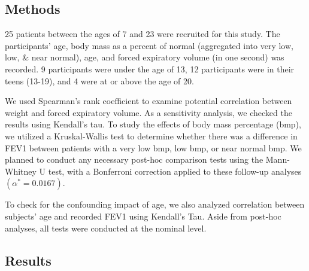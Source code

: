 \documentclass{article}
\begin{document}
		\subsection*{Methods}
		25 patients between the ages of 7 and 23 were recruited for this study. The participants’ age, body mass as a percent of normal (aggregated into very low, low, \& near normal), age, and forced expiratory volume (in one second) was recorded. 9 participants were under the age of 13, 12 participants were in their teens (13-19), and 4 were at or above the age of 20. 

		We used Spearman’s rank coefficient to examine potential correlation between weight and forced expiratory volume. As a sensitivity analysis, we checked the results using Kendall’s tau. To study the effects of body mass percentage (bmp), we utilized a Kruskal-Wallis test to determine whether there was a difference in FEV1 between patients with a very low bmp, low bmp, or near normal bmp. We planned to conduct any necessary post-hoc comparison tests using the Mann-Whitney U test, with a Bonferroni correction applied to these follow-up analyses $(\alpha^* = 0.0167)$. 

		To check for the confounding impact of age, we also analyzed correlation between subjects’ age and recorded FEV1 using Kendall’s Tau. Aside from post-hoc analyses, all tests were conducted at the nominal level.

		\subsection*{Results}


		
\end{document}
